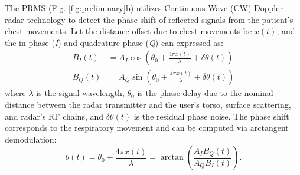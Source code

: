 The PRMS (Fig. \ref{fig:preliminary}b) utilizes Continuous Wave (CW) Doppler radar technology to detect the phase shift of reflected signals from the patient's chest movements. Let the distance offset due to chest movements be $x(t)$, and the in-phase (\textit{I}) and quadrature phase (\textit{Q}) can expressed as:
\begin{align*}
  {B}_I(t) &= A_I\cos\left(\theta_0+\frac{4\pi x(t)}{\lambda}+\delta\theta(t)\right)\\
  {B}_Q(t) &= A_Q\sin\left(\theta_0+\frac{4\pi x(t)}{\lambda}+\delta\theta(t)\right)
\end{align*}
where $\lambda$ is the signal wavelength, $\theta_0$ is the phase delay due to the nominal distance between the radar transmitter and the user's torso, surface scattering, and radar's RF chains, and $\delta\theta(t)$ is the residual phase noise. The phase shift corresponds to the respiratory movement and can be computed via arctangent demodulation:
\begin{equation*}
  \theta(t) = \theta_0 + \frac{4\pi x(t)}{\lambda} = \arctan \left(\frac{A_I{B}_Q(t)}{A_Q{B}_I(t)}\right).
\end{equation*}






